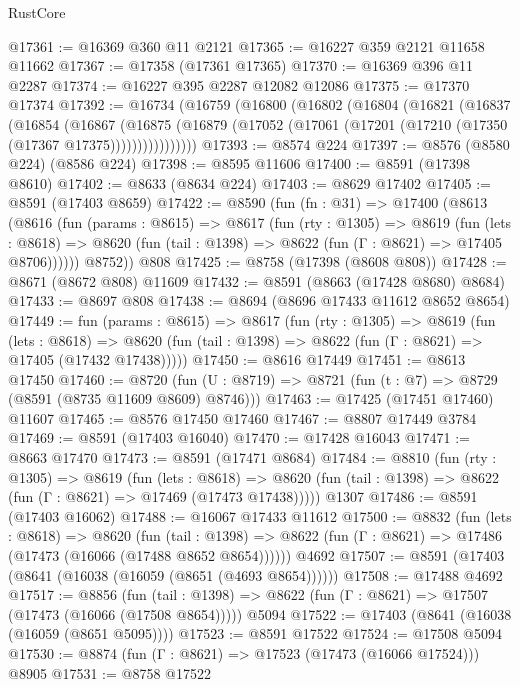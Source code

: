 \begin{lexlean}{RustCore}
\begin{coremodule}
@17361 := @16369 @360 @11 @2121
@17365 := @16227 @359 @2121 @11658 @11662
@17367 := @17358 (@17361 @17365)
@17370 := @16369 @396 @11 @2287
@17374 := @16227 @395 @2287 @12082 @12086
@17375 := @17370 @17374
@17392 := @16734
    (@16759
      (@16800
        (@16802
          (@16804
            (@16821
              (@16837
                (@16854
                  (@16867
                    (@16875
                      (@16879 (@17052 (@17061 (@17201 (@17210 (@17350 (@17367 @17375))))))))))))))))
@17393 := @8574 @224
@17397 := @8576 (@8580 @224) (@8586 @224)
@17398 := @8595 @11606
@17400 := @8591 (@17398 @8610)
@17402 := @8633 (@8634 @224)
@17403 := @8629 @17402
@17405 := @8591 (@17403 @8659)
@17422 := @8590
    (fun (fn : @31) =>
    @17400
      (@8613
        (@8616
          (fun (params : @8615) =>
          @8617
            (fun (rty : @1305) =>
            @8619
              (fun (lets : @8618) =>
              @8620 (fun (tail : @1398) => @8622 (fun (Γ : @8621) => @17405 @8706))))))
        @8752))
    @808
@17425 := @8758 (@17398 (@8608 @808))
@17428 := @8671 (@8672 @808) @11609
@17432 := @8591 (@8663 (@17428 @8680) @8684)
@17433 := @8697 @808
@17438 := @8694 (@8696 @17433 @11612 @8652 @8654)
@17449 := fun (params : @8615) =>
  @8617
    (fun (rty : @1305) =>
    @8619
      (fun (lets : @8618) =>
      @8620 (fun (tail : @1398) => @8622 (fun (Γ : @8621) => @17405 (@17432 @17438)))))
@17450 := @8616 @17449
@17451 := @8613 @17450
@17460 := @8720
    (fun (U : @8719) => @8721 (fun (t : @7) => @8729 (@8591 (@8735 @11609 @8609) @8746)))
@17463 := @17425 (@17451 @17460) @11607
@17465 := @8576 @17450 @17460
@17467 := @8807 @17449 @3784
@17469 := @8591 (@17403 @16040)
@17470 := @17428 @16043
@17471 := @8663 @17470
@17473 := @8591 (@17471 @8684)
@17484 := @8810
    (fun (rty : @1305) =>
    @8619
      (fun (lets : @8618) =>
      @8620 (fun (tail : @1398) => @8622 (fun (Γ : @8621) => @17469 (@17473 @17438)))))
    @1307
@17486 := @8591 (@17403 @16062)
@17488 := @16067 @17433 @11612
@17500 := @8832
    (fun (lets : @8618) =>
    @8620
      (fun (tail : @1398) =>
      @8622 (fun (Γ : @8621) => @17486 (@17473 (@16066 (@17488 @8652 @8654))))))
    @4692
@17507 := @8591 (@17403 (@8641 (@16038 (@16059 (@8651 (@4693 @8654))))))
@17508 := @17488 @4692
@17517 := @8856
    (fun (tail : @1398) => @8622 (fun (Γ : @8621) => @17507 (@17473 (@16066 (@17508 @8654)))))
    @5094
@17522 := @17403 (@8641 (@16038 (@16059 (@8651 @5095))))
@17523 := @8591 @17522
@17524 := @17508 @5094
@17530 := @8874 (fun (Γ : @8621) => @17523 (@17473 (@16066 @17524))) @8905
@17531 := @8758 @17522

\end{coremodule}
\end{lexlean}
